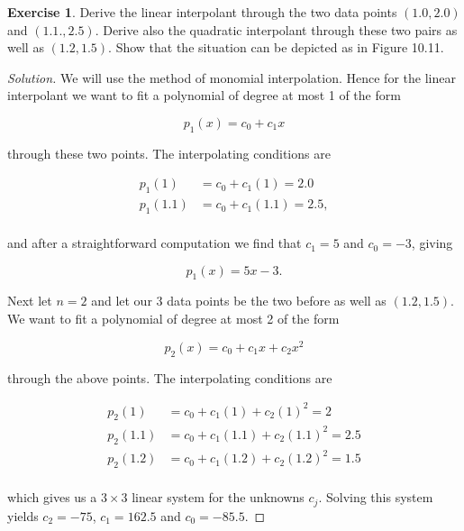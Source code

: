 \documentclass[12pt,a4]{article}
\theoremstyle{definition}
\newtheorem{exercise}{Exercise}
\begin{document}
\begin{exercise}
	Derive the linear interpolant through the two data points $(1.0, 2.0)$ and $(1.1., 2.5)$. Derive also the quadratic interpolant through these two pairs as well as $(1.2, 1.5)$. Show that the situation can be depicted as in Figure 10.11. 
\end{exercise}
\begin{proof}[Solution]
	We will use the method of monomial interpolation. Hence for the linear interpolant we want to fit a polynomial of degree at most 1 of the form 
	
	\[
	p_1(x) = c_0 + c_1 x 
	\]
	
	\noindent through these two points. The interpolating conditions are 
	
	\begin{align*}
	p_1(1) &= c_0 + c_1(1) = 2.0 \\
	p_1(1.1) &= c_0 + c_1(1.1) = 2.5 {,} \\
	\end{align*}
	
	\noindent and after a straightforward computation we find that $c_1 = 5$ and $c_0 = -3$, giving 
	
	\[
	p_1(x) = 5 x - 3 {.}
	\]
	
	\noindent Next let $n = 2$ and let our 3 data points be the two before as well as $(1.2, 1.5)$. We want to fit a polynomial of degree at most 2  of the form 
	
	\[
	p_2(x) = c_0 + c_1 x + c_2 x^2
	\]
	
	\noindent through the above points. The interpolating conditions are 
	
	\begin{align*}
	p_2(1) &= c_0 + c_1 (1) + c_2 (1)^2 = 2 \\
	p_2(1.1) &= c_0 + c_1 (1.1) + c_2 (1.1)^2 = 2.5 \\
	p_2(1.2) &= c_0 + c_1 (1.2) + c_2 (1.2)^2 = 1.5 \\
	\end{align*}
	
	\noindent which gives us a $3 \times 3$ linear system for the unknowns $c_j$. Solving this system yields $c_2 = -75$, $c_1 = 162.5$ and $c_0 = -85.5$.
\end{proof}
\end{document}
